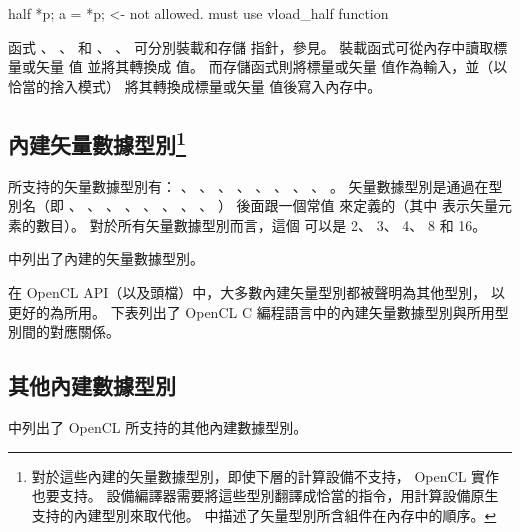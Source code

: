 half *p;
a = *p;		<- not allowed. must use vload_half function
\stopclc

函式 、 、 
和 、 、 
可分別裝載和存儲  指針，參見。
裝載函式可從內存中讀取標量或矢量  值 並將其轉換成  值。
而存儲函式則將標量或矢量  值作為輸入，並（以恰當的捨入模式）
將其轉換成標量或矢量  值後寫入內存中。


\subsection[sec:bivdt]{內建矢量數據型別\footnote{%
對於這些內建的矢量數據型別，即使下層的計算設備不支持， OpenCL 實作也要支持。
設備編譯器需要將這些型別翻譯成恰當的指令，用計算設備原生支持的內建型別來取代他。
中描述了矢量型別所含組件在內存中的順序。}}

所支持的矢量數據型別有：
、 、
、 、
、 、
、 、
。
矢量數據型別是通過在型別名（即
、 、
、 、
、 、
、 、
）
後面跟一個常值  來定義的（其中  表示矢量元素的數目）。
對於所有矢量數據型別而言，這個  可以是 2、 3、 4、 8 和 16。

中列出了內建的矢量數據型別。

{}

在 OpenCL API（以及頭檔）中，大多數內建矢量型別都被聲明為其他型別，
以更好的為所用。
下表列出了 OpenCL C 編程語言中的內建矢量數據型別與所用型別間的對應關係。



\subsection[sec:obidt]{其他內建數據型別}

中列出了 OpenCL 所支持的其他內建數據型別。

{}

